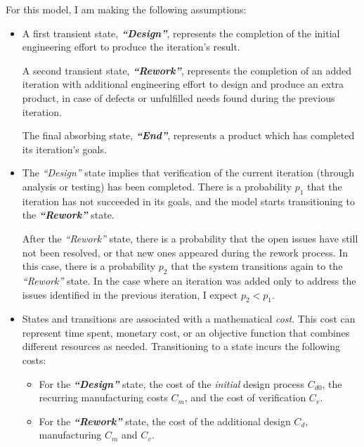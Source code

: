 \documentclass[a4paper,nobib,justified,final]{tufte-book}
\begin{document}
For this model, I am making the following assumptions:
\begin{itemize}[itemsep=-1ex]
	\item A first transient state, \textbf{\emph{``Design''}}, represents the completion of the initial engineering effort to produce the iteration's result.
	
	A second transient state, \textbf{\emph{``Rework''}}, represents the completion of an added iteration with additional engineering effort to design and produce an extra product, in case of defects or unfulfilled needs found during the previous iteration.
	
	The final absorbing state, \textbf{\emph{``End''}}, represents a product which has completed its iteration's goals.
	\item The \emph{``Design''} state implies that verification of the current iteration (through analysis or testing) has been completed. There is a probability \( p_1 \) that the iteration has not succeeded in its goals, and the model starts transitioning to the \textbf{\emph{``Rework''}} state.
	
	After the \emph{``Rework''} state, there is a probability that the open issues have still not been resolved, or that new ones appeared during the rework process. In this case, there is a probability \( p_2 \) that the system transitions again to the \emph{``Rework''} state. In the case where an iteration was added only to address the issues identified in the previous iteration, I expect \( p_2 < p_1 \).
	\item States and transitions are associated with a mathematical \emph{cost}. This cost can represent time spent, monetary cost, or an objective function that combines different resources as needed. Transitioning to a state incurs the following costs:
	\begin{itemize}[itemsep=-2ex]
		\item For the \textbf{\emph{``Design''}} state, the cost of the \emph{initial} design process \( C_{d0} \), the recurring manufacturing costs \( C_m \), and the cost of verification \( C_v \).
		\item For the \textbf{\emph{``Rework''}} state, the cost of the additional design \( C_d \), manufacturing \( C_m \) and \( C_v \).
	\end{itemize}
\end{itemize}
\end{document}
